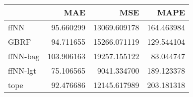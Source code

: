 \begin{tabular}{lrrr}
\toprule
{} &         MAE &           MSE &        MAPE \\
\midrule
ffNN     &   95.660299 &  13069.609178 &  164.463984 \\
GBRF     &   94.711655 &  15266.071119 &  129.544104 \\
ffNN-bag &  103.906163 &  19257.155122 &   83.044747 \\
ffNN-lgt &   75.106565 &   9041.334700 &  189.123378 \\
tope     &   92.476686 &  12145.617989 &  203.181318 \\
\bottomrule
\end{tabular}
